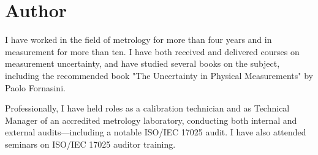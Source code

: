 \section*{Author}
I have worked in the field of metrology for more than four years and in measurement for more than ten. I have both received and delivered courses on measurement uncertainty, and have studied several books on the subject, including the recommended book "The Uncertainty in Physical Measurements" by Paolo Fornasini. 

Professionally, I have held roles as a calibration technician and as Technical Manager of an accredited metrology laboratory, conducting both internal and external audits—including a notable ISO/IEC 17025 audit. I have also attended seminars on ISO/IEC 17025 auditor training.
